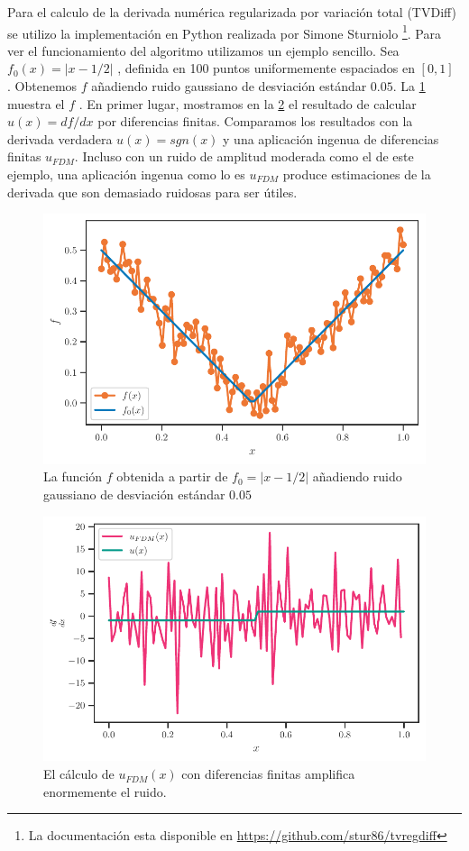 Para el calculo de la derivada numérica regularizada por variación total (TVDiff) se utilizo la implementación en Python realizada por Simone Sturniolo \footnote{La documentación esta disponible en \url{https://github.com/stur86/tvregdiff}}. Para ver el funcionamiento del algoritmo utilizamos  un ejemplo sencillo.  Sea $f_0(x)=\left| x-1/2\right|$ , definida en 100 puntos uniformemente espaciados en  $[0,1]$ . Obtenemos  $f$  añadiendo ruido gaussiano de desviación estándar $0.05$. La \cref{f:funcion_ruidosa} muestra el  $f$ . En primer lugar, mostramos en la \cref{f:derivada_centrada} el resultado de calcular  $u(x)=df/dx$ por diferencias finitas. Comparamos los resultados con la derivada verdadera  $u(x)=sgn(x)$ y una aplicación ingenua de diferencias finitas $u_{FDM}$. Incluso  con un ruido de amplitud moderada como el de este ejemplo, una aplicación ingenua como lo es $u_{FDM}$ produce estimaciones de la derivada que son demasiado ruidosas para ser útiles.


\begin{figure}[h!]
\centering{}\includegraphics[width=\imsize]{funcion_ruidosa.pdf}
\caption{La función $f$ obtenida a partir de  $f_0=\left| x-1/2\right|$   añadiendo ruido gaussiano de desviación estándar $0.05$}\label{f:funcion_ruidosa}  
\end{figure}

\begin{figure}[h!]
	\centering{}\includegraphics[width=\imsize]{derivada_centrada.pdf}
	\caption{El cálculo de $u_{FDM}(x)$ con diferencias finitas amplifica enormemente el ruido.}\label{f:derivada_centrada}  
\end{figure}


